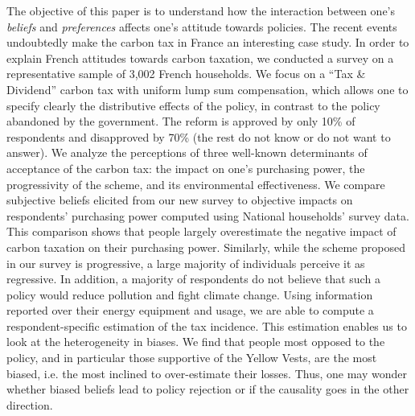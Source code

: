 \documentclass[11pt]{article}
\begin{document}
The objective of this paper is to understand how the interaction between one's \textit{beliefs} and \textit{preferences} affects one's attitude towards policies. The recent events undoubtedly make the carbon tax in France an interesting case study. In order to explain French attitudes towards carbon taxation, we conducted a survey on a representative sample of 3,002 French households. We focus on a ``Tax \& Dividend'' carbon tax with uniform lump sum compensation, which allows one to specify clearly the distributive effects of the policy, in contrast to the policy abandoned by the government. The reform is approved by only 10\% of respondents and disapproved by 70\% (the rest do not know or do not want to answer). We analyze the perceptions of three well-known determinants of acceptance of the carbon tax: the impact on one's purchasing power, the progressivity of the scheme, and its environmental effectiveness. We compare subjective beliefs elicited from our new survey to objective impacts on respondents' purchasing power computed using National households' survey data. This comparison shows that people largely overestimate the negative impact of carbon taxation on their purchasing power. Similarly, while the scheme proposed in our survey is progressive, a large majority of individuals perceive it as regressive. In addition, a majority of respondents do not believe that such a policy would reduce pollution and fight climate change. Using information reported over their energy equipment and usage, we are able to compute a respondent-specific estimation of the tax incidence. This estimation enables us to look at the heterogeneity in biases. We find that people most opposed to the policy, and in particular those supportive of the Yellow Vests, are the most biased, i.e. the most inclined to over-estimate their losses. Thus, one may wonder whether biased beliefs lead to policy rejection or if the causality goes in the other direction.
\end{document}
